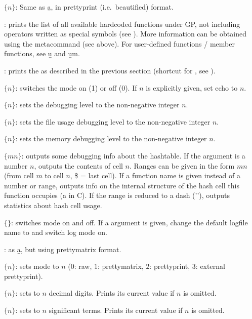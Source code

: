  $\{n\}$: Same as \b{a}, in prettyprint (i.e.~beautified)
format.

: prints the list of all available
hardcoded functions under GP, not including operators written as special
symbols (see ). More information can be obtained using
the  metacommand (see above). For user-defined functions / member
functions, see \b{u} and \b{um}.

: prints the  as described in the
previous section (shortcut for , see ).

 $\{n\}$: switches the  mode on (1) or off (0). If
$n$ is explicitly given, set echo to $n$.

 $\{n\}$: sets the debugging level  to the
non-negative integer $n$.

 $\{n\}$: sets the file usage debugging level 
to the non-negative integer $n$.

 $\{n\}$: sets the memory debugging level 
to the non-negative integer $n$.

 $\{m$\kbd{-}$n\}$: outputs some debugging info about the
hashtable. If the argument is a number $n$, outputs the contents of cell
$n$. Ranges can be given in the form $m$\kbd{-}$n$ (from cell $m$ to cell
$n$, \$ = last cell). If a function name is given instead of a number or
range, outputs info on the internal structure of the hash cell this
function occupies (a  in C). If the range is reduced to
a dash ('\kbd{-}'), outputs statistics about hash cell usage.

 $\{$$\}$: switches  mode on and off.
If a  argument is given, change the default logfile name to 
 and switch log mode on.

: as \b{a}, but using prettymatrix format.

 $\{n\}$: sets  mode to $n$ ($0$: raw, $1$:
prettymatrix, $2$: prettyprint, $3$: external prettyprint).

 $\{n\}$: sets  to $n$ decimal
digits. Prints its current value if $n$ is omitted.

 $\{n\}$: sets  to $n$ significant terms.
Prints its current value if $n$ is omitted.


